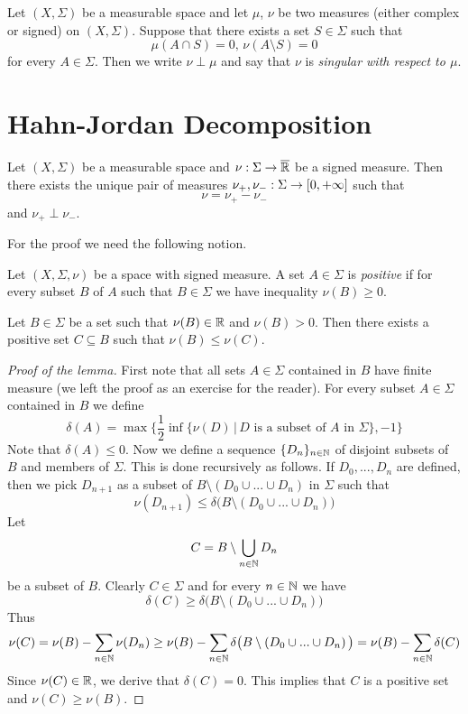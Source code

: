 \begin{definition}
Let $(X,\Sigma)$ be a measurable space and let $\mu$, $\nu$ be two measures (either complex or signed) on $(X,\Sigma)$. Suppose that there exists a set $S\in \Sigma$ such that
$$\mu(A\cap S) = 0,\,\nu(A\setminus S) = 0$$
for every $A \in \Sigma$. Then we write $\nu \perp \mu$ and say that $\nu$ is \textit{singular with respect to $\mu$}.
\end{definition}

\section{Hahn-Jordan Decomposition}

\begin{theorem}\label{theorem:jordansdecomposition}
Let $\left(X,\Sigma\right)$ be a measurable space and $\nu:\Sigma\rightarrow \overline{{\mathbb R}}$ be a signed measure. Then there exists the unique pair of measures $\nu_+,\nu_-:\Sigma \rightarrow [0,+\infty]$ such that  
$$\nu = \nu_+ - \nu_-$$
and $\nu_+ \perp \nu_-$.
\end{theorem}
\noindent
For the proof we need the following notion.

\begin{definition}
Let $(X,\Sigma,\nu)$ be a space with signed measure. A set $A\in \Sigma$ is \textit{positive} if for every subset $B$ of $A$ such that $B\in \Sigma$ we have inequality $\nu(B)\geq 0$. 
\end{definition}

\begin{lemma}\label{lemma:positiveexist}
Let $B\in \Sigma$ be a set such that $\nu(B)\in {\mathbb R}$ and $\nu(B)>0$. Then there exists a positive set $C\subseteq B$ such that $\nu(B)\leq \nu(C)$.
\end{lemma}
\begin{proof}[Proof of the lemma]
First note that all sets $A\in \Sigma$ contained in $B$ have finite measure (we left the proof as an exercise for the reader). For every subset $A\in \Sigma$ contained in $B$ we define
$$\delta(A) = \max\bigg\{\frac{1}{2}\inf\big\{\nu(D)\,\big|\,D\mbox{ is a subset of }A\mbox{ in }\Sigma\big\},-1\bigg\}$$
Note that $\delta(A)\leq 0$. Now we define a sequence $\{D_n\}_{n\in {\mathbb N}}$ of disjoint subsets of $B$ and members of $\Sigma$. This is done recursively as follows. If $D_0,...,D_n$ are defined, then we pick $D_{n+1}$ as a subset of $B\setminus \left(D_0\cup...\cup D_n\right)$ in $\Sigma$ such that
$$\nu(D_{n+1})\leq \delta\big(B\setminus \left(D_0\cup...\cup D_n\right)\big)$$
Let
$$C = B\setminus \bigcup_{n\in {\mathbb N}}D_n$$
be a subset of $B$. Clearly $C\in \Sigma$ and for every $n\in {\mathbb N}$ we have
$$\delta(C) \geq \delta\big(B\setminus \left(D_0\cup...\cup D_n\right)\big)$$
Thus
$$\nu(C) = \nu(B)-\sum_{n\in {\mathbb N}}\nu(D_n) \geq \nu(B) -\sum_{n\in {\mathbb N}}\delta\big(B\setminus \left(D_0\cup...\cup D_n\right)\big) = \nu(B) -\sum_{n\in {\mathbb N}}\delta(C)$$
Since $\nu(C)\in {\mathbb R}$, we derive that $\delta(C)=0$. This implies that $C$ is a positive set and $\nu(C)\geq \nu(B)$.
\end{proof}

